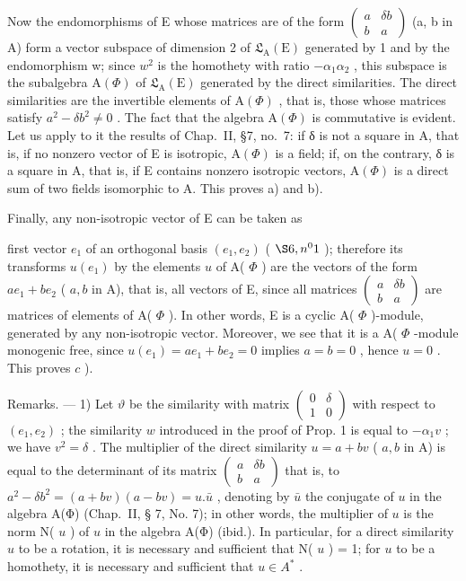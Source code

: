 Now the endomorphisms of E whose matrices are of the form \(\begin{pmatrix} a & \delta b \\ b & a \end{pmatrix}\) (a, b in A) form a vector subspace of dimension 2 of \(\mathfrak{L}_{\mathrm{A}}(\mathrm{E})\) generated by 1 and by the endomorphism w; since \(w^{2}\) is the homothety with ratio \(-\alpha_{1}\alpha_{2}\) , this subspace is the subalgebra \(\mathrm{A}(\Phi)\) of \(\mathfrak{L}_{\mathrm{A}}(\mathrm{E})\) generated by the direct similarities. The direct similarities are the invertible elements of \(\mathrm{A}(\Phi)\) , that is, those whose matrices satisfy \(a^{2}-\delta b^{2}\neq0\) . The fact that the algebra \(\mathrm{A}(\Phi)\) is commutative is evident. Let us apply to it the results of Chap.~II, §7, no.~7: if δ is not a square in A, that is, if no nonzero vector of E is isotropic, \(\mathrm{A}(\Phi)\) is a field; if, on the contrary, δ is a square in A, that is, if E contains nonzero isotropic vectors, \(\mathrm{A}(\Phi)\) is a direct sum of two fields isomorphic to A. This proves a) and b).

Finally, any non-isotropic vector of E can be taken as

first vector \(e_1\) of an orthogonal basis \((e_1, e_2)\) ( \(\S 6, n^0 1\) ); therefore its transforms \(u(e_1)\) by the elements \(u\) of A( \(\Phi\) ) are the vectors of the form \(ae_1 + be_2\) ( \(a, b\) in A), that is, all vectors of E, since all matrices \(\begin{pmatrix} a & \delta b \\ b & a \end{pmatrix}\) are matrices of elements of A( \(\Phi\) ). In other words, E is a cyclic A( \(\Phi\) )-module, generated by any non-isotropic vector. Moreover, we see that it is a A( \(\Phi\) -module monogenic free, since \(u(e_1) = ae_1 + be_2 = 0\) implies \(a = b = 0\) , hence \(u = 0\) . This proves \(c\) ).

Remarks. --- 1) Let \(\vartheta\) be the similarity with matrix \(\begin{pmatrix}0 & \delta \\ 1 & 0\end{pmatrix}\) with respect to \((e_1, e_2)\) ; the similarity \(w\) introduced in the proof of Prop. 1 is equal to \(-\alpha_1 v\) ; we have \(v^2 = \delta\) . The multiplier of the direct similarity \(u = a + b v\) ( \(a, b\) in A) is equal to the determinant of its matrix \(\begin{pmatrix}a & \delta b \\ b & a\end{pmatrix}\) that is, to \(a^2 - \delta b^2 = (a + b v)(a - b v) = u.\bar{u}\) , denoting by \(\bar{u}\) the conjugate of \(u\) in the algebra A(Φ) (Chap.~II, § 7, No. 7); in other words, the multiplier of \(u\) is the norm N( \(u\) ) of \(u\) in the algebra A(Φ) (ibid.). In particular, for a direct similarity \(u\) to be a rotation, it is necessary and sufficient that N( \(u\) ) = 1; for \(u\) to be a homothety, it is necessary and sufficient that \(u \in A^*\) .

